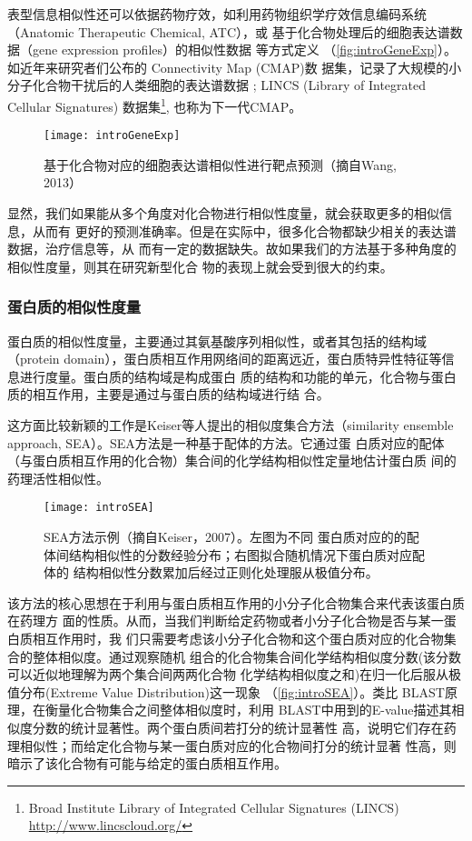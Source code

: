 表型信息相似性还可以依据药物疗效，如利用药物组织学疗效信息编码系统（Anatomic
Therapeutic Chemical, ATC）\cite{gottlieb2011predict,zhao2010network}，或
基于化合物处理后的细胞表达谱数据（gene expression profiles）的相似性数据
\cite{wang2013prediction}等方式定义
（\autoref{fig:introGeneExp}）。如近年来研究者们公布的 Connectivity Map (CMAP)数
据集，记录了大规模的小分子化合物干扰后的人类细胞的表达谱数据
\cite{lamb2006connectivity}; LINCS (Library of Integrated Cellular Signatures)
数据集\footnote{Broad Institute Library of Integrated Cellular
Signatures (LINCS) \url{http://www.lincscloud.org/}}, 也称为下一代CMAP。
\begin{figure}[htb]
  \centering
  \texttt{[image: introGeneExp]}
  \caption{基于化合物对应的细胞表达谱相似性进行靶点预测（摘自Wang, 2013）\cite{wang2013prediction}}
  \label{fig:introGeneExp}
\end{figure}

显然，我们如果能从多个角度对化合物进行相似性度量，就会获取更多的相似信息，从而有
更好的预测准确率。但是在实际中，很多化合物都缺少相关的表达谱数据，治疗信息等，从
而有一定的数据缺失。故如果我们的方法基于多种角度的相似性度量，则其在研究新型化合
物的表现上就会受到很大的约束。
\subsubsection{蛋白质的相似性度量}
蛋白质的相似性度量，主要通过其氨基酸序列相似性，或者其包括的结构域（protein
domain），蛋白质相互作用网络间的距离远近，蛋白质特异性特征等信息进行度量。蛋白质的结构域是构成蛋白
质的结构和功能的单元，化合物与蛋白质的相互作用，主要是通过与蛋白质的结构域进行结
合\cite{bateman2004pfam,overington2006many}。

这方面比较新颖的工作是Keiser等人提出的相似度集合方法（similarity ensemble
approach, SEA）\cite{keiser2007relating}。SEA方法是一种基于配体的方法。它通过蛋
白质对应的配体（与蛋白质相互作用的化合物）集合间的化学结构相似性定量地估计蛋白质
间的药理活性相似性。
\begin{figure}[htbp] \centering
  \texttt{[image: introSEA]}
  \caption{SEA方法示例（摘自Keiser，2007）\cite{keiser2007relating}。左图为不同
蛋白质对应的的配体间结构相似性的分数经验分布；右图拟合随机情况下蛋白质对应配体的
结构相似性分数累加后经过正则化处理服从极值分布。}
  \label{fig:introSEA}
\end{figure}

该方法的核心思想在于利用与蛋白质相互作用的小分子化合物集合来代表该蛋白质在药理方
面的性质。从而，当我们判断给定药物或者小分子化合物是否与某一蛋白质相互作用时，我
们只需要考虑该小分子化合物和这个蛋白质对应的化合物集合的整体相似度。通过观察随机
组合的化合物集合间化学结构相似度分数(该分数可以近似地理解为两个集合间两两化合物
化学结构相似度之和)在归一化后服从极值分布(Extreme Value Distribution)这一现象
\cite{hosking1985estimation}（\autoref{fig:introSEA}）。类比
BLAST\cite{altschul1997gapped}原理，在衡量化合物集合之间整体相似度时，利用
BLAST中用到的E-value描述其相似度分数的统计显著性。两个蛋白质间若打分的统计显著性
高，说明它们存在药理相似性；而给定化合物与某一蛋白质对应的化合物间打分的统计显著
性高，则暗示了该化合物有可能与给定的蛋白质相互作用。

